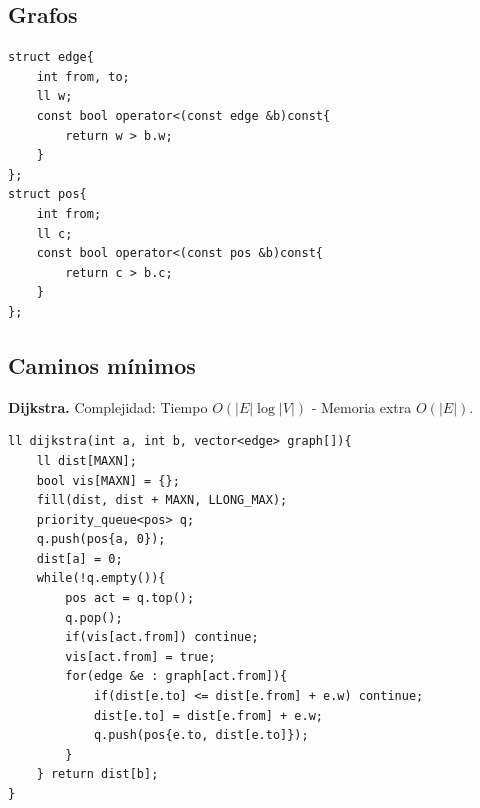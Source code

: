 \documentclass[10pt,spanish,mexico]{article}
\numberwithin{equation}{section}
\begin{document}
\begin{multicols}{2}

\vspace{-1.2\baselineskip}
\hrulefill
\section{Grafos}
\begin{verbatim}
struct edge{
    int from, to;
    ll w;
    const bool operator<(const edge &b)const{
        return w > b.w;
    }
};
struct pos{
    int from;
    ll c;
    const bool operator<(const pos &b)const{
        return c > b.c;
    }
};
\end{verbatim}

\vspace{-\baselineskip}
\hrulefill
\subsection{Caminos mínimos}
\textbf{Dijkstra.} Complejidad: Tiempo $O(|E| \log |V|)$ - Memoria extra $O(|E|)$.
\begin{verbatim}
ll dijkstra(int a, int b, vector<edge> graph[]){
    ll dist[MAXN];
    bool vis[MAXN] = {};
    fill(dist, dist + MAXN, LLONG_MAX);
    priority_queue<pos> q;
    q.push(pos{a, 0});
    dist[a] = 0;
    while(!q.empty()){
        pos act = q.top();
        q.pop();
        if(vis[act.from]) continue;
        vis[act.from] = true;
        for(edge &e : graph[act.from]){
            if(dist[e.to] <= dist[e.from] + e.w) continue;
            dist[e.to] = dist[e.from] + e.w;
            q.push(pos{e.to, dist[e.to]});
        }
    } return dist[b];
}
\end{verbatim}


\end{multicols}
\end{document}
